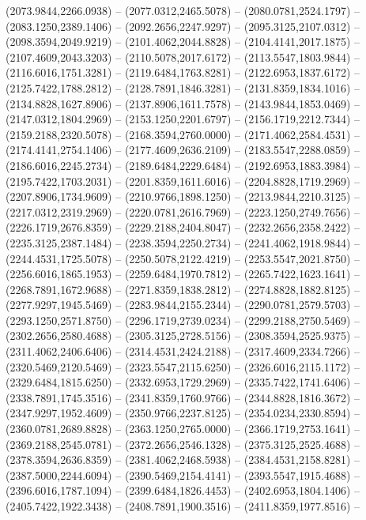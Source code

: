 \begin{scope}[y=0.80pt, x=0.80pt, yscale=-1.000000, xscale=1.000000, inner sep=0pt, outer sep=0pt]
    (2073.9844,2266.0938) -- (2077.0312,2465.5078) -- (2080.0781,2524.1797) --
    (2083.1250,2389.1406) -- (2092.2656,2247.9297) -- (2095.3125,2107.0312) --
    (2098.3594,2049.9219) -- (2101.4062,2044.8828) -- (2104.4141,2017.1875) --
    (2107.4609,2043.3203) -- (2110.5078,2017.6172) -- (2113.5547,1803.9844) --
    (2116.6016,1751.3281) -- (2119.6484,1763.8281) -- (2122.6953,1837.6172) --
    (2125.7422,1788.2812) -- (2128.7891,1846.3281) -- (2131.8359,1834.1016) --
    (2134.8828,1627.8906) -- (2137.8906,1611.7578) -- (2143.9844,1853.0469) --
    (2147.0312,1804.2969) -- (2153.1250,2201.6797) -- (2156.1719,2212.7344) --
    (2159.2188,2320.5078) -- (2168.3594,2760.0000) -- (2171.4062,2584.4531) --
    (2174.4141,2754.1406) -- (2177.4609,2636.2109) -- (2183.5547,2288.0859) --
    (2186.6016,2245.2734) -- (2189.6484,2229.6484) -- (2192.6953,1883.3984) --
    (2195.7422,1703.2031) -- (2201.8359,1611.6016) -- (2204.8828,1719.2969) --
    (2207.8906,1734.9609) -- (2210.9766,1898.1250) -- (2213.9844,2210.3125) --
    (2217.0312,2319.2969) -- (2220.0781,2616.7969) -- (2223.1250,2749.7656) --
    (2226.1719,2676.8359) -- (2229.2188,2404.8047) -- (2232.2656,2358.2422) --
    (2235.3125,2387.1484) -- (2238.3594,2250.2734) -- (2241.4062,1918.9844) --
    (2244.4531,1725.5078) -- (2250.5078,2122.4219) -- (2253.5547,2021.8750) --
    (2256.6016,1865.1953) -- (2259.6484,1970.7812) -- (2265.7422,1623.1641) --
    (2268.7891,1672.9688) -- (2271.8359,1838.2812) -- (2274.8828,1882.8125) --
    (2277.9297,1945.5469) -- (2283.9844,2155.2344) -- (2290.0781,2579.5703) --
    (2293.1250,2571.8750) -- (2296.1719,2739.0234) -- (2299.2188,2750.5469) --
    (2302.2656,2580.4688) -- (2305.3125,2728.5156) -- (2308.3594,2525.9375) --
    (2311.4062,2406.6406) -- (2314.4531,2424.2188) -- (2317.4609,2334.7266) --
    (2320.5469,2120.5469) -- (2323.5547,2115.6250) -- (2326.6016,2115.1172) --
    (2329.6484,1815.6250) -- (2332.6953,1729.2969) -- (2335.7422,1741.6406) --
    (2338.7891,1745.3516) -- (2341.8359,1760.9766) -- (2344.8828,1816.3672) --
    (2347.9297,1952.4609) -- (2350.9766,2237.8125) -- (2354.0234,2330.8594) --
    (2360.0781,2689.8828) -- (2363.1250,2765.0000) -- (2366.1719,2753.1641) --
    (2369.2188,2545.0781) -- (2372.2656,2546.1328) -- (2375.3125,2525.4688) --
    (2378.3594,2636.8359) -- (2381.4062,2468.5938) -- (2384.4531,2158.8281) --
    (2387.5000,2244.6094) -- (2390.5469,2154.4141) -- (2393.5547,1915.4688) --
    (2396.6016,1787.1094) -- (2399.6484,1826.4453) -- (2402.6953,1804.1406) --
    (2405.7422,1922.3438) -- (2408.7891,1900.3516) -- (2411.8359,1977.8516) --

\end{scope}
